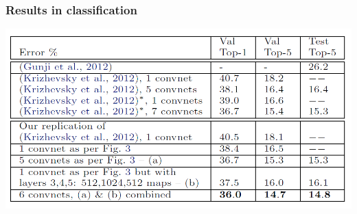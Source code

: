 \begin{frame}
	\frametitle{Results in classification}
	\begin{center}
		\includegraphics[scale=0.7]{figs/ZFNet_classif_results}
	\end{center}
\end{frame}

